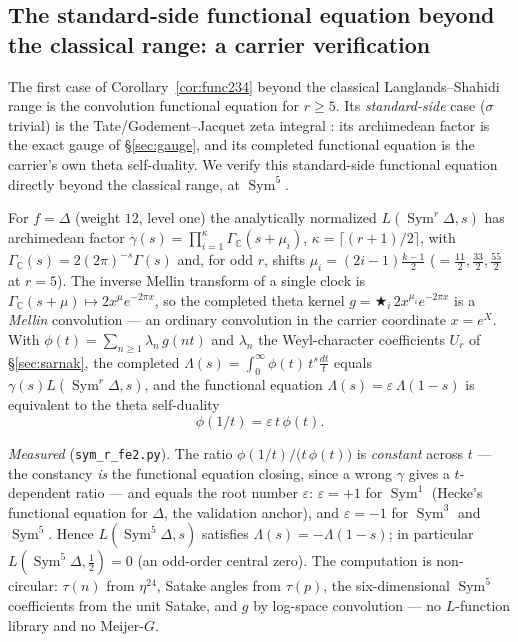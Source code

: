 \documentclass[11pt]{article}
\theoremstyle{definition}
\newcommand{\Sym}{\operatorname{Sym}}
\begin{document}
\subsection{The standard-side functional equation beyond the classical range: a carrier verification}\label{sec:sym5}

The first case of Corollary~\ref{cor:func234} beyond the classical Langlands--Shahidi range is the
convolution functional equation for $r\ge5$. Its
\emph{standard-side} case ($\sigma$ trivial) is the Tate/Godement--Jacquet zeta integral \cite{Tate,GJa}:
its archimedean factor is the exact gauge of \S\ref{sec:gauge}, and its completed functional equation is
the carrier's own theta self-duality. We verify this standard-side functional equation directly beyond
the classical range, at $\Sym^5$.

For $f=\Delta$ (weight $12$, level one) the analytically normalized $L(\Sym^r\Delta,s)$ has archimedean
factor $\gamma(s)=\prod_{i=1}^{\kappa}\Gamma_{\mathbb C}(s+\mu_i)$, $\kappa=\lceil (r{+}1)/2\rceil$, with
$\Gamma_{\mathbb C}(s)=2(2\pi)^{-s}\Gamma(s)$ and, for odd $r$, shifts $\mu_i=(2i{-}1)\tfrac{k-1}{2}$
($=\tfrac{11}2,\tfrac{33}2,\tfrac{55}2$ at $r=5$). The inverse Mellin transform of a single clock is
$\Gamma_{\mathbb C}(s+\mu)\!\mapsto\! 2x^{\mu}e^{-2\pi x}$, so the completed theta kernel
$g=\bigstar_{i}\,2x^{\mu_i}e^{-2\pi x}$ is a \emph{Mellin} convolution --- an ordinary convolution in the
carrier coordinate $x=e^{X}$. With $\phi(t)=\sum_{n\ge1}\lambda_n\,g(nt)$ and $\lambda_n$ the
Weyl-character coefficients $U_r$ of \S\ref{sec:sarnak}, the completed $\Lambda(s)=\int_0^\infty\phi(t)\,
t^{s}\tfrac{dt}{t}$ equals $\gamma(s)L(\Sym^r\Delta,s)$, and the functional equation
$\Lambda(s)=\varepsilon\,\Lambda(1-s)$ is equivalent to the theta self-duality
\begin{equation}\label{eq:thetaselfdual}
  \phi(1/t)=\varepsilon\,t\,\phi(t).
\end{equation}

\emph{Measured} (\texttt{sym\_r\_fe2.py}). The ratio $\phi(1/t)/\bigl(t\,\phi(t)\bigr)$ is \emph{constant}
across $t$ --- the constancy \emph{is} the functional equation closing, since a wrong $\gamma$ gives a
$t$-dependent ratio --- and equals the root number $\varepsilon$: $\varepsilon=+1$ for $\Sym^1$ (Hecke's
functional equation for $\Delta$, the validation anchor), and $\varepsilon=-1$ for $\Sym^3$ and $\Sym^5$.
Hence $L(\Sym^5\Delta,s)$ satisfies $\Lambda(s)=-\Lambda(1-s)$; in particular $L(\Sym^5\Delta,\tfrac12)=0$
(an odd-order central zero). The computation is non-circular: $\tau(n)$ from $\eta^{24}$, Satake angles
from $\tau(p)$, the six-dimensional $\Sym^5$ coefficients from the unit Satake, and $g$ by log-space
convolution --- no $L$-function library and no Meijer-$G$.
\end{document}
